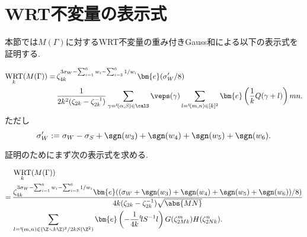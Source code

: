 \documentclass[11pt,b5paper,oneside,lualatex]{ltjsarticle} %
\DeclareMathOperator{\WRT}{WRT}
\numberwithin{equation}{section} %
\begin{document}
\section{WRT不変量の表示式} \label{sec:WRT}


本節では$ M(\Gamma) $に対するWRT不変量の重み付きGauss和による以下の表示式を証明する. 

\begin{prop} \label{prop:WRT_rep_Bernoulli}
	\begin{align}
		\WRT_k(M(\Gamma)) 
		= \,
		&\zeta_{4k}^{3\sigma_W - \sum_{i=1}^{6}w_{i} - \sum_{i=3}^{6} 1/w_{i}}
		\bm{e}(\sigma'_W/8)
		\\
		&\frac{1}{2k^2 (\zeta_{2k}-\zeta_{2k}^{-1})}
		\sum_{\gamma = {}^t\!(\alpha, \beta) \in \calS} 
		\veps(\gamma)
		\sum_{l = {}^t\!(m, n) \in [k]^2}
		\bm{e}\left( \frac{1}{k} Q(\gamma + l) \right) mn.
	\end{align}
	ただし
	\[
	\sigma'_W
	:=
	\sigma_W  - \sigma_S + \sgn(w_3) + \sgn(w_4) +\sgn(w_5) + \sgn(w_6).
	\]
\end{prop}

証明のためにまず次の表示式を求める. 

\begin{prop} \label{prop:WRT_first_calculation}
	\begin{align}
		&\WRT_k(M(\Gamma)) 
		\\
		= \, &\frac{\zeta_{4k}^{3\sigma_W - \sum_{i=1}^{6}w_{i} - \sum_{i=3}^{6} 1/w_{i}} 
			\bm{e}((\sigma_W + \sgn(w_3) + \sgn(w_4) +\sgn(w_5) + \sgn(w_6))/8)}
		{4k (\zeta_{2k}-\zeta_{2k}^{-1}) \sqrt{\abs{MN}}}
		\\
		&\sum_{l = {}^t\!(m, n) \in (\Z \smallsetminus k\Z)^2/2kS(\Z^2)}
		\bm{e} \left( -\frac{1}{4k} {}^t\!l S^{-1} l \right)
		G(\zeta_{2Mk}^{m}) H(\zeta_{2Nk}^{n}).
	\end{align}
\end{prop}
\end{document}
